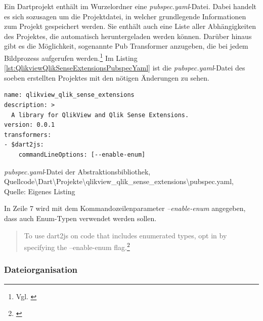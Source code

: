 Ein Dartprojekt enthält im Wurzelordner eine \textit{pubspec.yaml}-Datei. Dabei handelt es sich sozusagen um die Projektdatei, in welcher grundlegende Informationen zum Projekt gespeichert werden. Sie enthält auch eine Liste aller Abhängig\-keiten des Projektes, die automatisch heruntergeladen werden können. Darüber hinaus gibt es die Möglich\-keit, sogenannte Pub Transformer anzugeben, die bei jedem Bildprozess aufgerufen werden.\footnote{Vgl. \cite{PubspecFormat}} Im Listing \ref{lst:QlikviewQlikSenseExtensionsPubspecYaml} ist die \textit{pubspec.yaml}-Datei des soeben erstellten Projektes mit den nötigen Änderungen zu sehen.



\begin{listing}[htbp]
\begin{verbatim}
name: qlikview_qlik_sense_extensions
description: >
  A library for QlikView and Qlik Sense Extensions.
version: 0.0.1
transformers:
- $dart2js:
    commandLineOptions: [--enable-enum]
\end{verbatim}
\caption[\textit{pubspec.yaml}-Datei der Abstraktionsbibliothek]{\textit{pubspec.yaml}-Datei der Abstraktionsbibliothek, \\Quellcode\textbackslash{}Dart\textbackslash{}Projekte\textbackslash{}qlikview\_qlik\_sense\_extensions\textbackslash{}pubspec.yaml, \\Quelle: Eigenes Listing}
\label{lst:QlikviewQlikSenseExtensionsPubspecYaml}
\end{listing}

In Zeile 7 wird mit dem Kommandozeilenparameter \textit{--enable-enum} angegeben, dass auch Enum-Typen verwendet werden sollen. 
\begin{quote}
To use dart2js on code that includes enumerated types, opt in by specifying the --enable-enum flag.\footnote{\cite{dart2js}}
\end{quote}


\subsubsection{Dateiorganisation}

